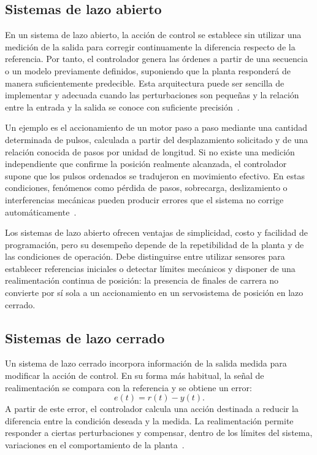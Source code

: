 \subsection{Sistemas de lazo abierto}
En un sistema de lazo abierto, la acción de control se establece sin utilizar una medición de la salida para corregir continuamente la diferencia respecto de la referencia. Por tanto, el controlador genera las órdenes a partir de una secuencia o un modelo previamente definidos, suponiendo que la planta responderá de manera suficientemente predecible. Esta arquitectura puede ser sencilla de implementar y adecuada cuando las perturbaciones son pequeñas y la relación entre la entrada y la salida se conoce con suficiente precisión~\cite{nise2015control}.

Un ejemplo es el accionamiento de un motor paso a paso mediante una cantidad determinada de pulsos, calculada a partir del desplazamiento solicitado y de una relación conocida de pasos por unidad de longitud. Si no existe una medición independiente que confirme la posición realmente alcanzada, el controlador supone que los pulsos ordenados se tradujeron en movimiento efectivo. En estas condiciones, fenómenos como pérdida de pasos, sobrecarga, deslizamiento o interferencias mecánicas pueden producir errores que el sistema no corrige automáticamente~\cite{franklin2010feedback,nise2015control}.

Los sistemas de lazo abierto ofrecen ventajas de simplicidad, costo y facilidad de programación, pero su desempeño depende de la repetibilidad de la planta y de las condiciones de operación. Debe distinguirse entre utilizar sensores para establecer referencias iniciales o detectar límites mecánicos y disponer de una realimentación continua de posición: la presencia de finales de carrera no convierte por sí sola a un accionamiento en un servosistema de posición en lazo cerrado.

\subsection{Sistemas de lazo cerrado}
Un sistema de lazo cerrado incorpora información de la salida medida para modificar la acción de control. En su forma más habitual, la señal de realimentación se compara con la referencia y se obtiene un error:
\begin{equation}
    e(t)=r(t)-y(t).
\end{equation}
A partir de este error, el controlador calcula una acción destinada a reducir la diferencia entre la condición deseada y la medida. La realimentación permite responder a ciertas perturbaciones y compensar, dentro de los límites del sistema, variaciones en el comportamiento de la planta~\cite{astrom2020feedback,nise2015control}.

